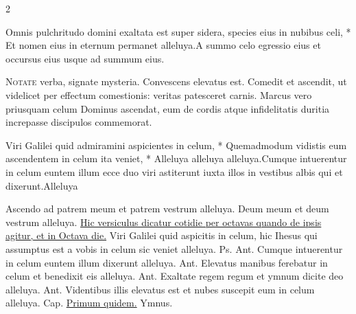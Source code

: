 \begin{multicols*}{2}
\begin{responsory}
{Omnis pulchritudo domini exaltata est super sidera, species eius in nubibus celi, * Et nomen eius in eternum permanet alleluya.}{A summo celo egressio eius et occursus eius usque ad summum eius.}
\end{responsory}%
\lettrine[lines=2]{\zallmancaps \color{Red} N}{otate} verba, signate mysteria. Convescens elevatus est. Comedit et ascendit, ut videlicet per effectum comestionis: veritas patesceret carnis. Marcus vero priusquam celum Dominus ascendat, eum de cordis atque infidelitatis duritia increpasse discipulos commemorat.
\begin{responsory-final}
{Viri Galilei quid admiramini aspicientes in celum, * Quemadmodum vidistis eum ascendentem in celum ita veniet, * Alleluya alleluya alleluya.}{Cumque intuerentur in celum euntem illum ecce duo viri astiterunt iuxta illos in vestibus albis qui et dixerunt.}{Alleluya}
\end{responsory-final}%
\newline \V Ascendo ad patrem meum et patrem vestrum alleluya. \V Deum meum et deum vestrum alleluya.
\newline \ul{Hic versiculus dicatur cotidie per octavas quando de ipsis agitur, et in Octava die.}
 Viri Galilei quid aspicitis in celum, hic Ihesus qui assumptus est a vobis in celum sic veniet alleluya. {\color{Red} Ps.}  {\color{Red} Ant.} Cumque intuerentur in celum euntem illum dixerunt alleluya. {\color{Red} Ant.} Elevatus manibus ferebatur in celum et benedixit eis alleluya. {\color{Red} Ant.} Exaltate regem regum et ymnum dicite deo alleluya. {\color{Red} Ant.} Videntibus illis elevatus est et nubes suscepit eum in celum alleluya. {\color{Red} Cap.} \hyperlink{primum-quidem-capitulum}{Primum quidem.} {\color{Red} Ymnus.}
\end{multicols*}
